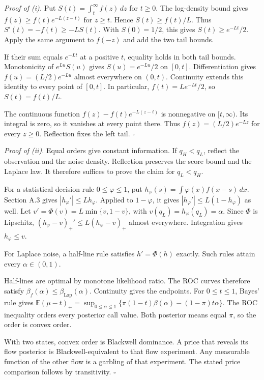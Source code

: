\documentclass[
  11pt,
]{article}
\begin{document}
\emph{Proof of (i).} Put \(S(t)=\int_t^\infty f(z)\,dz\) for \(t\ge0\).
The log-density bound gives \(f(z)\ge f(t)e^{-L(z-t)}\) for \(z\ge t\).
Hence \(S(t)\ge f(t)/L\).
Thus \(S'(t)=-f(t)\ge-LS(t)\).
With \(S(0)=1/2\), this gives \(S(t)\ge e^{-Lt}/2\).
Apply the same argument to \(f(-z)\) and add the two tail bounds.
\par
If their sum equals \(e^{-Lt}\) at a positive \(t\), equality holds in both tail bounds.
Monotonicity of \(e^{Lu}S(u)\) gives \(S(u)=e^{-Lu}/2\) on \([0,t]\).
Differentiation gives \(f(u)=(L/2)e^{-Lu}\) almost everywhere on \((0,t)\).
Continuity extends this identity to every point of \([0,t]\).
In particular, \(f(t)=Le^{-Lt}/2\), so \(S(t)=f(t)/L\).
\par
The continuous function \(f(z)-f(t)e^{-L(z-t)}\) is nonnegative on \([t,\infty)\).
Its integral is zero, so it vanishes at every point there.
Thus \(f(z)=(L/2)e^{-Lz}\) for every \(z\ge0\).
Reflection fixes the left tail. \(\square\)

\emph{Proof of (ii).} Equal orders give constant information.
If \(q_H<q_L\), reflect the observation and the noise density.
Reflection preserves the score bound and the Laplace law.
It therefore suffices to prove the claim for \(q_L<q_H\).
\par
For a statistical decision rule \(0\le\varphi\le1\), put \(h_\varphi(s)=\int\varphi(x)f(x-s)\,dx\).
Section A.3 gives \(|h_\varphi'|\le Lh_\varphi\).
Applied to \(1-\varphi\), it gives \(|h_\varphi'|\le L(1-h_\varphi)\) as well.
Let \(v'=\Phi(v)=L\min\{v,1-v\}\), with \(v(q_L)=h_\varphi(q_L)=\alpha\).
Since \(\Phi\) is Lipschitz, \((h_\varphi-v)_+'\le L(h_\varphi-v)_+\) almost everywhere.
Integration gives \(h_\varphi\le v\).
\par
For Laplace noise, a half-line rule satisfies \(h'=\Phi(h)\) exactly.
Such rules attain every \(\alpha\in(0,1)\).
\par
Half-lines are optimal by monotone likelihood ratio.
The ROC curves therefore satisfy \(\beta_f(\alpha)\le\beta_{\mathrm{Lap}}(\alpha)\).
Continuity gives the endpoints.
For \(0\le t\le1\), Bayes' rule gives \(\mathbb E(\mu-t)_+=\sup_{0\le\alpha\le1}\{\pi(1-t)\beta(\alpha)-(1-\pi)t\alpha\}\).
The ROC inequality orders every posterior call value.
Both posterior means equal \(\pi\), so the order is convex order.
\par
With two states, convex order is Blackwell dominance.
A price that reveals its flow posterior is Blackwell-equivalent to that flow experiment.
Any measurable function of the other flow is a garbling of that experiment.
The stated price comparison follows by transitivity. \(\square\)
\end{document}
